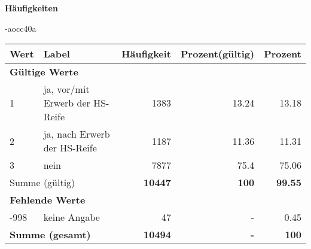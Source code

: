         		\vspace*{0.5cm}
                \noindent\textbf{Häufigkeiten}

                \vspace*{-\baselineskip}
					\begin{filecontents}{\jobname-aocc40a}
					\begin{longtable}{lXrrr}
					\toprule
					\textbf{Wert} & \textbf{Label} & \textbf{Häufigkeit} & \textbf{Prozent(gültig)} & \textbf{Prozent} \\
					\endhead
					\midrule
					\multicolumn{5}{l}{\textbf{Gültige Werte}}\\

					1 &
					\multicolumn{1}{X}{ ja, vor/mit Erwerb der HS-Reife   } &


					  \num{1383} &
					  \num[round-mode=places,round-precision=2]{13.24} &
					    \num[round-mode=places,round-precision=2]{13.18} \\

					2 &
					\multicolumn{1}{X}{ ja, nach Erwerb der HS-Reife   } &


					  \num{1187} &
					  \num[round-mode=places,round-precision=2]{11.36} &
					    \num[round-mode=places,round-precision=2]{11.31} \\

					3 &
					\multicolumn{1}{X}{ nein   } &


					  \num{7877} &
					  \num[round-mode=places,round-precision=2]{75.4} &
					    \num[round-mode=places,round-precision=2]{75.06} \\
					\midrule
					\multicolumn{2}{l}{Summe (gültig)} &
					  \textbf{\num{10447}} &
					\textbf{\num{100}} &
					  \textbf{\num[round-mode=places,round-precision=2]{99.55}} \\
					\multicolumn{5}{l}{\textbf{Fehlende Werte}}\\
							-998 &
							keine Angabe &
							  \num{47} &
							 - &
							  \num[round-mode=places,round-precision=2]{0.45} \\
					\midrule
					\multicolumn{2}{l}{\textbf{Summe (gesamt)}} &
				      \textbf{\num{10494}} &
				    \textbf{-} &
				    \textbf{\num{100}} \\
					\bottomrule
					\end{longtable}
					\end{filecontents}
